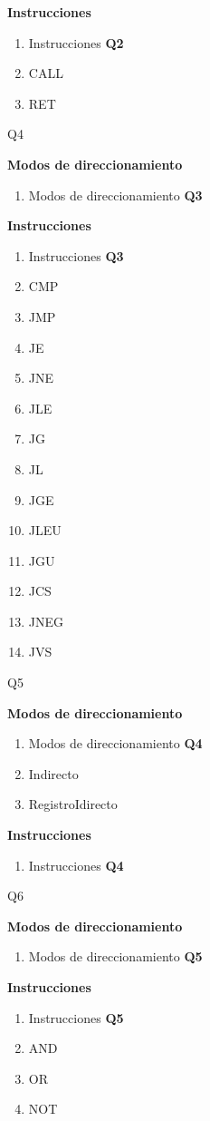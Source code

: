 \textbf{Instrucciones}
\begin{enumerate}
\item Instrucciones \textbf{Q2}
\item CALL
\item RET
\end{enumerate}

{Q4}

\textbf{Modos de direccionamiento}
\begin{enumerate}
\item Modos de direccionamiento \textbf{Q3}
\end{enumerate}

\textbf{Instrucciones}
\begin{enumerate}
\item Instrucciones \textbf{Q3}
\item CMP
\item JMP
\item JE 
\item JNE 
\item JLE 
\item JG 
\item JL 
\item JGE 
\item JLEU 
\item JGU 
\item JCS 
\item JNEG 
\item JVS
\end{enumerate}

{Q5}

\textbf{Modos de direccionamiento}
\begin{enumerate}
\item Modos de direccionamiento \textbf{Q4}
\item Indirecto
\item RegistroIdirecto
\end{enumerate}

\textbf{Instrucciones}
\begin{enumerate}
\item Instrucciones \textbf{Q4}
\end{enumerate}

{Q6}

\textbf{Modos de direccionamiento}
\begin{enumerate}
\item Modos de direccionamiento \textbf{Q5}
\end{enumerate}

\textbf{Instrucciones}
\begin{enumerate}
\item Instrucciones \textbf{Q5}
\item AND
\item OR
\item NOT
\end{enumerate}


